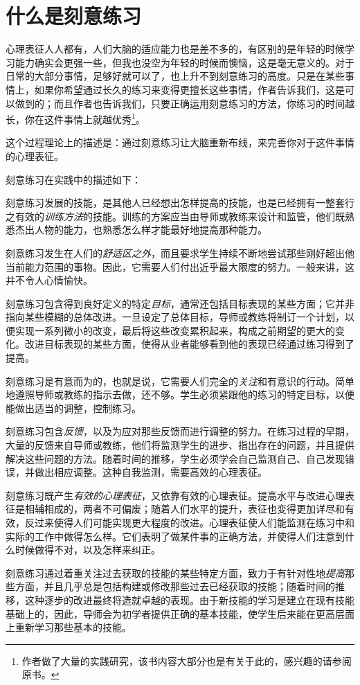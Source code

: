 \documentclass[12pt,oneside]{book}
\begin{document}
\section{什么是刻意练习}
心理表征人人都有，人们大脑的适应能力也是差不多的，有区别的是年轻的时候学习能力确实会更强一些，但我也没空为年轻的时候而懊恼，这是毫无意义的。对于日常的大部分事情，足够好就可以了，也上升不到刻意练习的高度。只是在某些事情上，如果你希望通过长久的练习来变得更擅长这些事情，作者告诉我们，这是可以做到的；而且作者也告诉我们，只要正确运用刻意练习的方法，你练习的时间越长，你在这件事情上就越优秀\footnote{作者做了大量的实践研究，该书内容大部分也是有关于此的，感兴趣的请参阅原书。}。

这个过程理论上的描述是：通过刻意练习让大脑重新布线，来完善你对于这件事情的心理表征。

刻意练习在实践中的描述如下：

\begin{bookref}[frametitle={\cite{刻意练习}}]
刻意练习发展的技能，是其他人已经想出怎样提高的技能，也是已经拥有一整套行之有效的\emph{训练方法}的技能。训练的方案应当由导师或教练来设计和监管，他们既熟悉杰出人物的能力，也熟悉怎么样才能最好地提高那种能力。

刻意练习发生在人们的\emph{舒适区之外}，而且要求学生持续不断地尝试那些刚好超出他当前能力范围的事物。因此，它需要人们付出近乎最大限度的努力。一般来讲，这并不令人心情愉快。

刻意练习包含得到良好定义的特定\emph{目标}，通常还包括目标表现的某些方面；它并非指向某些模糊的总体改进。一旦设定了总体目标，导师或教练将制订一个计划，以便实现一系列微小的改变，最后将这些改变累积起来，构成之前期望的更大的变化。改进目标表现的某些方面，使得从业者能够看到他的表现已经通过练习得到了提高。

刻意练习是有意而为的，也就是说，它需要人们完全的\emph{关注}和有意识的行动。简单地遵照导师或教练的指示去做，还不够。学生必须紧跟他的练习的特定目标，以便能做出适当的调整，控制练习。

刻意练习包含\emph{反馈}，以及为应对那些反馈而进行调整的努力。在练习过程的早期，大量的反馈来自导师或教练，他们将监测学生的进步、指出存在的问题，并且提供解决这些问题的方法。随着时间的推移，学生必须学会自己监测自己、自己发现错误，并做出相应调整。这种自我监测，需要高效的心理表征。

刻意练习既产生\emph{有效的心理表征}，又依靠有效的心理表征。提高水平与改进心理表征是相辅相成的，两者不可偏废；随着人们水平的提升，表征也变得更加详尽和有效，反过来使得人们可能实现更大程度的改进。心理表征使人们能监测在练习中和实际的工作中做得怎么样。它们表明了做某件事的正确方法，并使得人们注意到什么时候做得不对，以及怎样来纠正。

刻意练习通过着重关注过去获取的技能的某些特定方面，致力于有针对性地\emph{提高}那些方面，并且几乎总是包括构建或修改那些过去已经获取的技能；随着时间的推移，这种逐步的改进最终将造就卓越的表现。由于新技能的学习是建立在现有技能基础上的，因此，导师会为初学者提供正确的基本技能，使学生后来能在更高层面上重新学习那些基本的技能。
\end{bookref}
\end{document}
